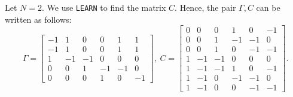 \documentclass[onefignum,onetabnum]{siamonline220329}
\begin{document}
{Let $N=2$. We use \texttt{LEARN} to find the matrix $C$. Hence,  the pair $\Gamma,C$ can be written as follows:
{\tiny \[      \Gamma=\left[\begin{array}{rrrrrr} -1 & 1 & 0 & 0 & 1 & 1\\ -1 & 1 & 0 & 0 & 1 & 1\\ 1 & -1 & -1 & 0 & 0 & 0\\ 0 & 0 & 1 & -1 & -1 & 0\\ 0 & 0 & 0 & 1 & 0 & -1 \end{array}\right],
	 ~     C= \left[\begin{array}{rrrrrr} 0 & 0 & 0 & 1 & 0 & -1\\ 0 & 0 & 1 & -1 & -1 & 0\\ 0 & 0 & 1 & 0 & -1 & -1\\ 1 & -1 & -1 & 0 & 0 & 0\\ 1 & -1 & -1 & 1 & 0 & -1\\ 1 & -1 & 0 & -1 & -1 & 0\\ 1 & -1 & 0 & 0 & -1 & -1 \end{array}\right].
	 \]}
	 
}
\end{document}
